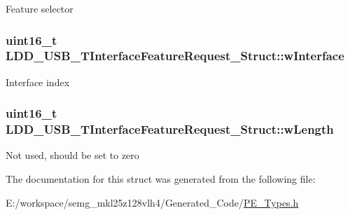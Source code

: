 Feature selector \hypertarget{struct_l_d_d___u_s_b___t_interface_feature_request___struct_afc1da433b4a02f8c6a6ed6ce8b3065da}{
\subsubsection[{w\-Interface}]{\setlength{\rightskip}{0pt plus 5cm}uint16\-\_\-t L\-D\-D\-\_\-\-U\-S\-B\-\_\-\-T\-Interface\-Feature\-Request\-\_\-\-Struct\-::w\-Interface}}\label{struct_l_d_d___u_s_b___t_interface_feature_request___struct_afc1da433b4a02f8c6a6ed6ce8b3065da}
Interface index \hypertarget{struct_l_d_d___u_s_b___t_interface_feature_request___struct_a5f54f1e83024342d9d63aad374a117ba}{
\subsubsection[{w\-Length}]{\setlength{\rightskip}{0pt plus 5cm}uint16\-\_\-t L\-D\-D\-\_\-\-U\-S\-B\-\_\-\-T\-Interface\-Feature\-Request\-\_\-\-Struct\-::w\-Length}}\label{struct_l_d_d___u_s_b___t_interface_feature_request___struct_a5f54f1e83024342d9d63aad374a117ba}
Not used, should be set to zero 

The documentation for this struct was generated from the following file\-:\begin{DoxyCompactItemize}
\item 
E\-:/workspace/semg\-\_\-mkl25z128vlh4/\-Generated\-\_\-\-Code/\hyperlink{_p_e___types_8h}{P\-E\-\_\-\-Types.\-h}\end{DoxyCompactItemize}
